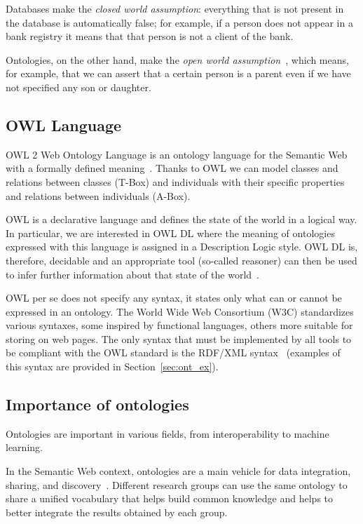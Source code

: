 Databases make the \emph{closed world assumption}: everything that is not present in the database is automatically false; for example, if a person does not appear in a bank registry it means that that person is not a client of the bank.

Ontologies, on the other hand, make the \emph{open world assumption}~\cite{krotzsch2012description}, which means, for example, that we can assert that a certain person is a parent even if we have not specified any son or daughter.

\subsection{OWL Language}
\label{sec:owl}
OWL 2 Web Ontology Language is an ontology language for the Semantic Web with a formally defined meaning~\cite{hitzler2012owl}. Thanks to OWL we can model classes and relations between classes (T-Box) and individuals with their specific properties and relations between individuals (A-Box). 

OWL is a declarative language and defines the state of the world in a logical way. In particular, we are interested in OWL DL where the meaning of ontologies expressed with this language is assigned in a Description Logic style. OWL DL is, therefore, decidable and an appropriate tool (so-called reasoner) can then be used to infer further information about that state of the world~\cite{hitzler2012owl}. 

OWL per se does not specify any syntax, it states only what can or cannot be expressed in an ontology. The World Wide Web Consortium (W3C) standardizes various syntaxes, some inspired by functional languages, others more suitable for storing on web pages. The only syntax that must be implemented by all tools to be compliant with the OWL standard is the RDF/XML syntax~\cite{hitzler2012owl} (examples of this syntax are provided in Section~\ref{sec:ont_ex}).

\subsection{Importance of ontologies}
Ontologies are important in various fields, from interoperability to machine learning.

In the Semantic Web context, ontologies are a main vehicle for data integration, sharing, and discovery~\cite{hitzler2021review}. Different research groups can use the same ontology to share a unified vocabulary that helps build common knowledge and helps to better integrate the results obtained by each group.


